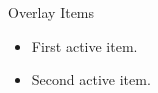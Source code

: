 \documentclass[14pt,t]{beamer}
\begin{document}
\begin{frame}{Overlay Items}
\begin{itemize}
\item<1-> First active item.
\item<2-> Second active item.
\end{itemize}
\end{frame}
\end{document}
